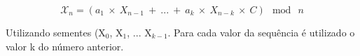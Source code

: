 \begin{equation}
	\label{Função para produção dos números}
	\mathcal{X}_n = (a_1\: \times \: X_{n-1} \: + \: ...  \: + \: a_k \: \times \: X_{n-k} \: \times \:  C) \: \bmod \: n
\end{equation}

Utilizando sementes (X$_0$, X$_1$, ... X$_{k-1}$. Para cada valor da sequência é utilizado o valor k do número anterior. 

